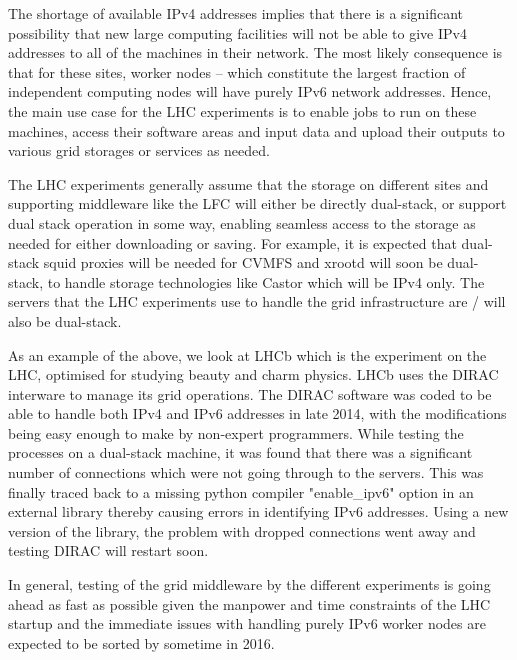 

The shortage of available IPv4 addresses implies that there is a significant possibility that new large
computing facilities will not be able to give IPv4 addresses to all of the machines in their network. The
most likely consequence is that for these sites, worker nodes -- which constitute the largest fraction of
independent computing nodes will have purely IPv6 network addresses. Hence, the main use case for the LHC
experiments is to enable jobs to run on these machines, access their software areas and input data and
upload their outputs to various grid storages or services as needed.

The LHC experiments generally assume \cite{LHCassumption} that the storage on different sites and
supporting middleware \cite{middleware} like the LFC will either be directly dual-stack, or support
dual stack operation in some way, enabling seamless access to the storage as needed for either downloading
or saving. For example, it is expected that dual-stack squid proxies will be needed for CVMFS and xrootd
will soon be dual-stack, to handle storage technologies like Castor which will be IPv4 only. The
servers that the LHC experiments use to handle the grid infrastructure are / will also be dual-stack.

As an example of the above, we look at LHCb \cite{LHCb} which is the experiment on the LHC, optimised
for studying beauty and charm physics. LHCb uses the DIRAC \cite{DIRAC} interware to manage its grid
operations. The DIRAC software was coded to be able to handle both IPv4 and IPv6 addresses in late 2014,
with the modifications being easy enough to make by non-expert programmers. While testing the processes
on a dual-stack machine, it was found that there was a significant number of connections which were not
going through to the servers. This was finally traced back to a missing python compiler "enable\_ipv6" option in an external library thereby causing errors in identifying IPv6 addresses. Using a new version of the library, the
problem with dropped connections went away and testing DIRAC will restart soon.

In general, testing of the grid middleware by the different experiments is going ahead as fast as possible
given the manpower and time constraints of the LHC startup and the immediate issues with handling purely
IPv6 worker nodes are expected to be sorted by sometime in 2016.


